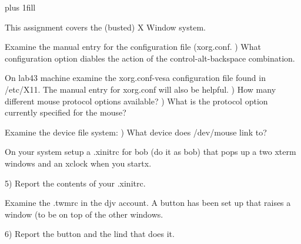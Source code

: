 
\rightskip=0pt plus 1fill

\parindent 0pt

This assignment covers the (busted) X Window system.

Examine the manual entry for the configuration file ({\ltt{}xorg.conf}.
\hfill{}) What configuration option diables the action of the control-alt-backspace
combination.

On {\ltt{}lab43} machine examine the {\ltt{}xorg.conf-vesa}  configuration file
found in {\ltt{}/etc/X11}.
The manual entry for {\ltt{}xorg.conf} will also be helpful.
\hfill{}) How many different mouse protocol options available?
\hfill{}) What is the protocol option currently specified for the mouse?

Examine the device file system:
\hfill{}) What device does {\ltt{}/dev/mouse} link to?

On your system setup a {\ltt{}.xinitrc} for {\ltt{}bob} (do it as bob)
that pops up a two xterm windows and an xclock when you startx.

5) Report the contents of your {\ltt{}.xinitrc}.

Examine the {\ltt{}.twmrc} in the {\ltt{}djv} account.
A button has been set up that raises a window (to be on
top of the other windows.

6) Report the button and the lind that does it.

\bye
